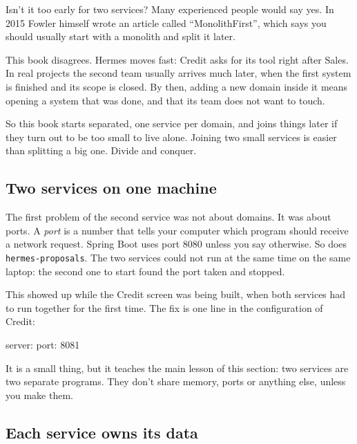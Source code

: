 \begin{question}{Isn't it too early for two services?}
Many experienced people would say yes. In 2015 Fowler himself wrote an
article called ``MonolithFirst'', which says you should usually start with a
monolith and split it later.

This book disagrees. Hermes moves fast: Credit asks for its tool right after
Sales. In real projects the second team usually arrives much later, when the
first system is finished and its scope is closed. By then, adding a new
domain inside it means opening a system that was done, and that its team
does not want to touch.

So this book starts separated, one service per domain, and joins things
later if they turn out to be too small to live alone. Joining two small
services is easier than splitting a big one. Divide and conquer.
\end{question}


\subsection*{Two services on one machine}

The first problem of the second service was not about domains. It was about
ports. A \emph{port} is a number that tells your computer which program
should receive a network request. Spring Boot uses port 8080 unless you say
otherwise. So does \texttt{hermes-proposals}. The two services could not run
at the same time on the same laptop: the second one to start found the port
taken and stopped.

This showed up while the Credit screen was being built, when both services
had to run together for the first time. The fix is one line in the
configuration of Credit:

\begin{code}[language={}]
server:
  port: 8081
\end{code}

It is a small thing, but it teaches the main lesson of this section: two
services are two separate programs. They don't share memory, ports or
anything else, unless you make them.

\subsection*{Each service owns its data}

